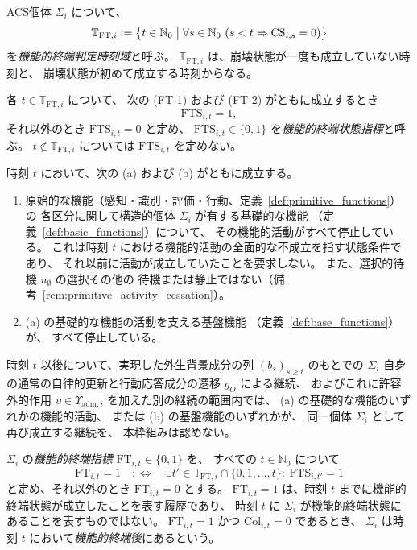 \begin{definition}[機能的終端状態指標と機能的終端指標]
\label{def:functional_termination}
ACS個体 $\Sigma_i$ について、
\[
  \mathbb{T}_{\mathrm{FT},i}
  :=
  \bigl\{
    t\in\mathbb{N}_0
    \bigm|
    \forall s\in\mathbb{N}_0\ (s<t \Rightarrow \mathrm{CS}_{i,s}=0)
  \bigr\}
\]
を\emph{機能的終端判定時刻域}と呼ぶ。
$\mathbb{T}_{\mathrm{FT},i}$ は、崩壊状態が一度も成立していない時刻と、
崩壊状態が初めて成立する時刻からなる。

各 $t\in\mathbb{T}_{\mathrm{FT},i}$ について、
次の (FT-1) および (FT-2) がともに成立するとき
\[
  \mathrm{FTS}_{i,t}=1,
\]
それ以外のとき $\mathrm{FTS}_{i,t}=0$ と定め、
$\mathrm{FTS}_{i,t}\in\{0,1\}$ を\emph{機能的終端状態指標}と呼ぶ。
$t\notin\mathbb{T}_{\mathrm{FT},i}$ については $\mathrm{FTS}_{i,t}$ を定めない。

\begin{description}[style=nextline]
  \item[(FT-1) 全面的機能停止]
  時刻 $t$ において、次の (a) および (b) がともに成立する。
  \begin{enumerate}[label=(\alph*)]
    \item 原始的な機能（感知・識別・評価・行動、定義~\ref{def:primitive_functions}）の
    各区分に関して構造的個体 $\Sigma_i$ が有する基礎的な機能
    （定義~\ref{def:basic_functions}）について、
    その機能的活動がすべて停止している。
    これは時刻 $t$ における機能的活動の全面的な不成立を指す状態条件であり、
    それ以前に活動が成立していたことを要求しない。
    また、選択的待機 $u_{\emptyset}$ の選択その他の
    待機または静止ではない（備考~\ref{rem:primitive_activity_cessation}）。
    \item (a) の基礎的な機能の活動を支える基盤機能
    （定義~\ref{def:base_functions}）が、
    すべて停止している。
  \end{enumerate}
  \item[(FT-2) 本枠組みに相対する同一個体としての非回復性]
  時刻 $t$ 以後について、実現した外生背景成分の列 $(b_s)_{s\geq t}$ のもとでの
  $\Sigma_i$ 自身の通常の自律的更新と行動応答成分の遷移 $g_O$ による継続、
  およびこれに許容外的作用 $\upsilon\in\Upsilon_{\mathrm{adm},i}$ を加えた別の継続の範囲内では、
  (a) の基礎的な機能のいずれかの機能的活動、
  または (b) の基盤機能のいずれかが、
  同一個体 $\Sigma_i$ として再び成立する継続を、
  本枠組みは認めない。
\end{description}

$\Sigma_i$ の\emph{機能的終端指標} $\mathrm{FT}_{i,t}\in\{0,1\}$ を、
すべての $t\in\mathbb{N}_0$ について
\[
  \mathrm{FT}_{i,t}=1
  \quad:\Longleftrightarrow\quad
  \exists t'\in\mathbb{T}_{\mathrm{FT},i}\cap\{0,1,\ldots,t\}:\ \mathrm{FTS}_{i,t'}=1
\]
と定め、それ以外のとき $\mathrm{FT}_{i,t}=0$ とする。
$\mathrm{FT}_{i,t}=1$ は、時刻 $t$ までに機能的終端状態が成立したことを表す履歴であり、
時刻 $t$ に $\Sigma_i$ が機能的終端状態にあることを表すものではない。
$\mathrm{FT}_{i,t}=1$ かつ $\mathrm{Col}_{i,t}=0$ であるとき、
$\Sigma_i$ は時刻 $t$ において\emph{機能的終端後}にあるという。


\end{definition}
